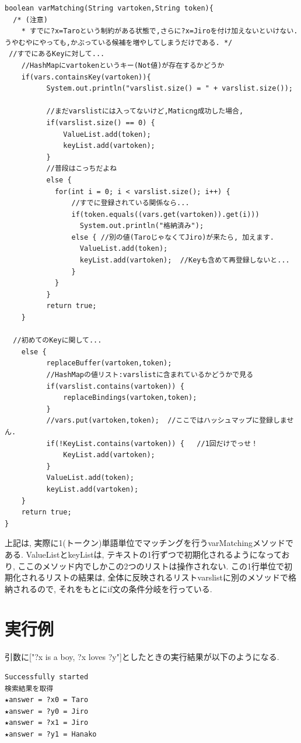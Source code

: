 \documentclass[uplatex,12pt]{jsarticle}
\begin{document}
\begin{lstlisting}[caption=複数候補に対応したvarMatchingメソッド,label=src:No4]
boolean varMatching(String vartoken,String token){
  /* (注意)
    * すでに?x=Taroという制約がある状態で,さらに?x=Jiroを付け加えないといけない. うやむやにやっても,かぶっている候補を増やしてしまうだけである. */
 //すでにあるKeyに対して...
    //HashMapにvartokenというキー(Not値)が存在するかどうか
    if(vars.containsKey(vartoken)){
    	  System.out.println("varslist.size() = " + varslist.size());

    	  //まだvarslistには入ってないけど,Maticng成功した場合,
    	  if(varslist.size() == 0) {
      		  ValueList.add(token);
      		  keyList.add(vartoken);
    	  }
    	  //普段はこっちだよね
    	  else {
    	  	for(int i = 0; i < varslist.size(); i++) {
    		    //すでに登録されている関係なら...
    		    if(token.equals((vars.get(vartoken)).get(i)))
    			  System.out.println("格納済み");
          	    else { //別の値(TaroじゃなくてJiro)が来たら, 加えます.
          		  ValueList.add(token);
          		  keyList.add(vartoken);  //Keyも含めて再登録しないと...
         	    }
    	  	}
    	  }
    	  return true;
    }

  //初めてのKeyに関して...
    else {
          replaceBuffer(vartoken,token);
          //HashMapの値リスト:varslistに含まれているかどうかで見る
          if(varslist.contains(vartoken)) {
              replaceBindings(vartoken,token);
          }
          //vars.put(vartoken,token);  //ここではハッシュマップに登録しません.
          if(!KeyList.contains(vartoken)) {   //1回だけでっせ！
        	  KeyList.add(vartoken);
          }
          ValueList.add(token);
          keyList.add(vartoken);
    }
    return true;
}
\end{lstlisting}

上記は, 実際に1(トークン)単語単位でマッチングを行うvarMatchingメソッドである. ValueListとkeyListは, テキストの1行ずつで初期化されるようになっており, ここのメソッド内でしかこの2つのリストは操作されない. この1行単位で初期化されるリストの結果は, 全体に反映されるリストvarslistに別のメソッドで格納されるので, それをもとにif文の条件分岐を行っている.

\section{実行例}
引数に["?x is a boy, ?x loves ?y"]としたときの実行結果が以下のようになる.
\begin{lstlisting}
Successfully started
検索結果を取得
★answer = ?x0 = Taro
★answer = ?y0 = Jiro
★answer = ?x1 = Jiro
★answer = ?y1 = Hanako
\end{lstlisting}
\end{document}
